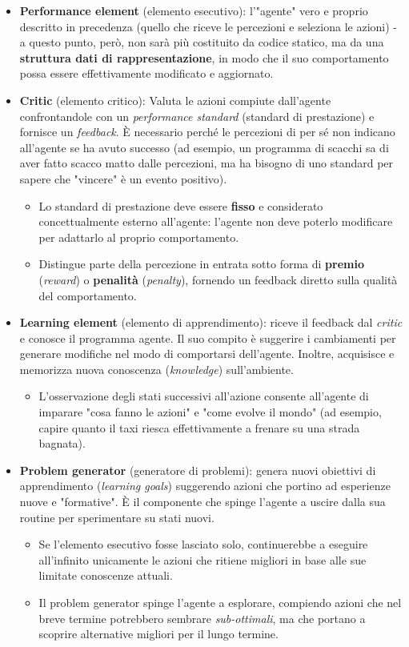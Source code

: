 \documentclass[a4paper,11pt]{report}
\begin{document}
\begin{itemize}
    \item \textbf{Performance element} (elemento esecutivo): l'"agente" vero e proprio descritto in precedenza (quello che riceve le percezioni e seleziona le azioni) - a questo punto, però, non sarà più costituito da codice statico, ma da una \textbf{struttura dati di rappresentazione}, in modo che il suo comportamento possa essere effettivamente modificato e aggiornato.
    \item \textbf{Critic} (elemento critico): Valuta le azioni compiute dall'agente confrontandole con un \textit{performance standard} (standard di prestazione) e fornisce un \textit{feedback}. È necessario perché le percezioni di per sé non indicano all'agente se ha avuto successo (ad esempio, un programma di scacchi sa di aver fatto scacco matto dalle percezioni, ma ha bisogno di uno standard per sapere che "vincere" è un evento positivo).
    \begin{itemize}
        \item Lo standard di prestazione deve essere \textbf{fisso} e considerato concettualmente esterno all'agente: l'agente non deve poterlo modificare per adattarlo al proprio comportamento.
        \item Distingue parte della percezione in entrata sotto forma di \textbf{premio} (\textit{reward}) o \textbf{penalità} (\textit{penalty}), fornendo un feedback diretto sulla qualità del comportamento.
    \end{itemize}

    \item \textbf{Learning element} (elemento di apprendimento): riceve il feedback dal \textit{critic} e conosce il programma agente. Il suo compito è suggerire i cambiamenti per generare modifiche nel modo di comportarsi dell'agente. Inoltre, acquisisce e memorizza nuova conoscenza (\textit{knowledge}) sull'ambiente.
\begin{itemize}
        \item L'osservazione degli stati successivi all'azione consente all'agente di imparare "cosa fanno le azioni" e "come evolve il mondo" (ad esempio, capire quanto il taxi riesca effettivamente a frenare su una strada bagnata).
\end{itemize}
    \item \textbf{Problem generator} (generatore di problemi): genera nuovi obiettivi di apprendimento (\textit{learning goals}) suggerendo azioni che portino ad esperienze nuove e "formative". È il componente che spinge l'agente a uscire dalla sua routine per sperimentare su stati nuovi.
    \begin{itemize}
        \item Se l'elemento esecutivo fosse lasciato solo, continuerebbe a eseguire all'infinito unicamente le azioni che ritiene migliori in base alle sue limitate conoscenze attuali. 
        \item Il problem generator spinge l'agente a esplorare, compiendo azioni che nel breve termine potrebbero sembrare \textit{sub-ottimali}, ma che portano a scoprire alternative migliori per il lungo termine.
    \end{itemize}
\end{itemize}
\end{document}
